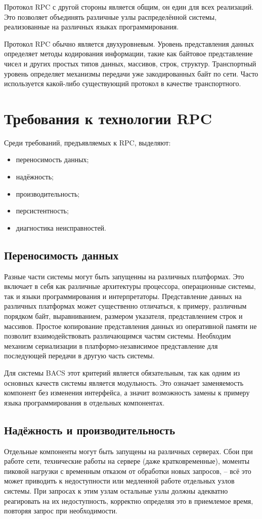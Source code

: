 Протокол RPC с другой стороны является общим, он един для всех реализаций.
Это позволяет объединять различные узлы распределённой системы, реализованные
на различных языках программирования.

Протокол RPC обычно является двухуровневым.
Уровень представления данных определяет методы кодирования информации,
такие как байтовое представление чисел и других простых типов данных,
массивов, строк, структур.
Транспортный уровень определяет механизмы передачи уже закодированных байт
по сети. Часто используется какой-либо существующий протокол в качестве
транспортного.

\section{Требования к технологии RPC}
Среди требований, предъявляемых к RPC, выделяют:
\begin{itemize}
    \item переносимость данных;
    \item надёжность;
    \item производительность;
    \item персистентность;
    \item диагностика неисправностей.
\end{itemize}

\subsection{Переносимость данных}
Разные части системы могут быть запущенны на различных платформах.
Это включает в себя как различные архитектуры процессора, операционные системы,
так и языки программирования и интерпретаторы. Представление данных на различных
платформах может существенно отличаться, к примеру, различным порядком байт,
выравниванием, размером указателя, представлением строк и массивов. Простое
копирование представления данных из оперативной памяти не позволит
взаимодействовать различающимся частям системы. Необходим механизм сериализации
в платформо-независимое представление для последующей передачи в другую часть
системы.

Для системы BACS этот критерий является обязательным, так как одним из основных
качеств системы является модульность. Это означает заменяемость компонент
без изменения интерфейса, а значит возможность замены к примеру языка
программирования в отдельных компонентах.

\subsection{Надёжность и производительность}
Отдельные компоненты могут быть запущены на различных серверах. Сбои при работе
сети, технические работы на сервере (даже кратковременные), моменты пиковой
нагрузки с временным отказом от обработки новых запросов, – всё это может
приводить к недоступности или медленной работе отдельных узлов системы.
При запросах к этим узлам остальные узлы должны адекватно реагировать на их
недоступность, корректно определяя это в приемлемое время, повторяя запрос
при необходимости.


